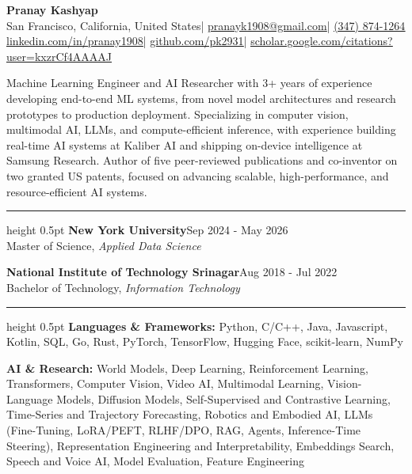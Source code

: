 \documentclass[letterpaper]{article}
\newcommand{\ressection}[1]{\par\vspace{3pt}{\fontsize{9}{10}\selectfont\bfseries #1}\par\vspace{1pt}\hrule height 0.5pt\vspace{1.25pt}}
\begin{document}
\fontsize{8.5}{9}\selectfont
\RaggedRight
\begin{center}
{\fontsize{17}{20}\selectfont\bfseries Pranay Kashyap}\\[5pt]
{\fontsize{7.2}{8.5}\selectfont San Francisco, California, United States\enspace|\enspace
\href{mailto:pranayk1908@gmail.com}{\underline{pranayk1908@gmail.com}}\enspace|\enspace
\href{tel:+13478741264}{\underline{(347) 874-1264}}\\[2pt]
\href{https://www.linkedin.com/in/pranay1908/}{\underline{linkedin.com/in/pranay1908}}\enspace|\enspace
\href{https://github.com/pk2931}{\underline{github.com/pk2931}}\enspace|\enspace
\href{https://scholar.google.com/citations?user=kxzrCf4AAAAJ}{\underline{scholar.google.com/citations?user=kxzrCf4AAAAJ}}}
\end{center}
\vspace{-5pt}
Machine Learning Engineer and AI Researcher with 3+ years of experience developing end-to-end ML systems, from novel model architectures and research prototypes to production deployment. Specializing in computer vision, multimodal AI, LLMs, and compute-efficient inference, with experience building real-time AI systems at Kaliber AI and shipping on-device intelligence at Samsung Research. Author of five peer-reviewed publications and co-inventor on two granted US patents, focused on advancing scalable, high-performance, and resource-efficient AI systems. \par
\ressection{EDUCATION}
\textbf{New York University}\hfill Sep 2024 - May 2026\\
Master of Science, \textit{Applied Data Science}\par\vspace{1pt}
\textbf{National Institute of Technology Srinagar}\hfill Aug 2018 - Jul 2022\\
Bachelor of Technology, \textit{Information Technology}
\ressection{SKILLS}
\textbf{Languages \& Frameworks:} Python, C/C++, Java, Javascript, Kotlin, SQL, Go, Rust, PyTorch, TensorFlow, Hugging Face, scikit-learn, NumPy\par\vspace{0.25pt}
\textbf{AI \& Research:} World Models, Deep Learning, Reinforcement Learning, Transformers, Computer Vision, Video AI, Multimodal Learning, Vision-Language Models, Diffusion Models, Self-Supervised and Contrastive Learning, Time-Series and Trajectory Forecasting, Robotics and Embodied AI, LLMs (Fine-Tuning, LoRA/PEFT, RLHF/DPO, RAG, Agents, Inference-Time Steering), Representation Engineering and Interpretability, Embeddings Search, Speech and Voice AI, Model Evaluation, Feature Engineering\par\vspace{0.25pt}
\end{document}
